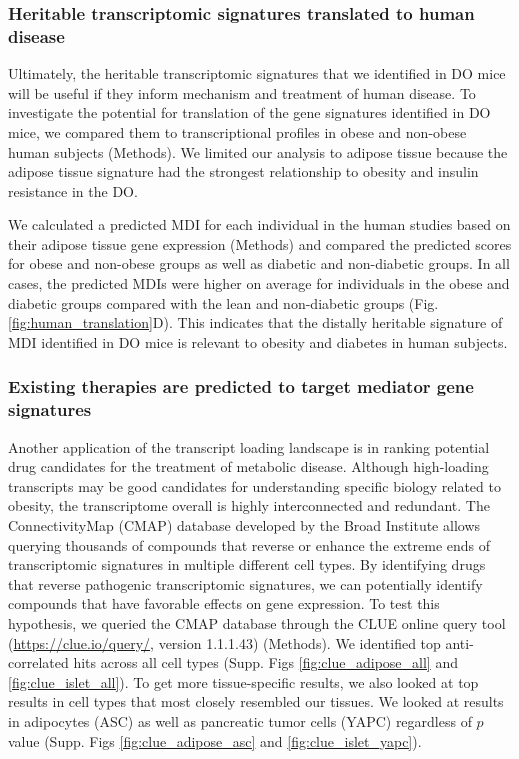 \documentclass[
]{article}
\begin{document}
\subsubsection{Heritable transcriptomic signatures translated to human
disease}\label{heritable-transcriptomic-signatures-translated-to-human-disease}

Ultimately, the heritable transcriptomic signatures that we identified
in DO mice will be useful if they inform mechanism and treatment of
human disease. To investigate the potential for translation of the gene
signatures identified in DO mice, we compared them to transcriptional
profiles in obese and non-obese human subjects (Methods). We limited our
analysis to adipose tissue because the adipose tissue signature had the
strongest relationship to obesity and insulin resistance in the DO.

We calculated a predicted MDI for each individual in the human studies
based on their adipose tissue gene expression (Methods) and compared the
predicted scores for obese and non-obese groups as well as diabetic and
non-diabetic groups. In all cases, the predicted MDIs were higher on
average for individuals in the obese and diabetic groups compared with
the lean and non-diabetic groups (Fig. \ref{fig:human_translation}D).
This indicates that the distally heritable signature of MDI identified
in DO mice is relevant to obesity and diabetes in human subjects.

\subsubsection{Existing therapies are predicted to target mediator gene
signatures}\label{existing-therapies-are-predicted-to-target-mediator-gene-signatures}

Another application of the transcript loading landscape is in ranking
potential drug candidates for the treatment of metabolic disease.
Although high-loading transcripts may be good candidates for
understanding specific biology related to obesity, the transcriptome
overall is highly interconnected and redundant. The ConnectivityMap
(CMAP) database \cite{pmid17008526, 
pmid29195078} developed by the Broad Institute allows querying thousands
of compounds that reverse or enhance the extreme ends of transcriptomic
signatures in multiple different cell types. By identifying drugs that
reverse pathogenic transcriptomic signatures, we can potentially
identify compounds that have favorable effects on gene expression. To
test this hypothesis, we queried the CMAP database through the CLUE
online query tool (\url{https://clue.io/query/}, version 1.1.1.43)
(Methods). We identified top anti-correlated hits across all cell types
(Supp. Figs \ref{fig:clue_adipose_all} and \ref{fig:clue_islet_all}). To
get more tissue-specific results, we also looked at top results in cell
types that most closely resembled our tissues. We looked at results in
adipocytes (ASC) as well as pancreatic tumor cells (YAPC) regardless of
\(p\) value (Supp. Figs \ref{fig:clue_adipose_asc} and
\ref{fig:clue_islet_yapc}).
\end{document}
